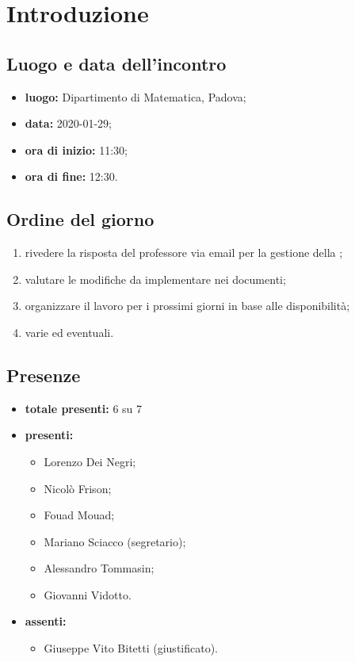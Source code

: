 \section*{Introduzione}

\subsection*{Luogo e data dell'incontro}
	\begin{itemize}
		\item \textbf{luogo:} Dipartimento di Matematica, Padova;
		\item \textbf{data:} 2020-01-29;
		\item \textbf{ora di inizio:} 11:30;
		\item \textbf{ora di fine:} 12:30.
	\end{itemize}

\subsection*{Ordine del giorno}
	\begin{enumerate}
			\item rivedere la risposta del professore via email per la gestione della ;
  			\item valutare le modifiche da implementare nei documenti;
  			\item organizzare il lavoro per i prossimi giorni in base alle disponibilità;
  			\item varie ed eventuali.
	\end{enumerate}

\subsection*{Presenze}
	\begin{itemize}
		\item \textbf{totale presenti:} 6 su 7
		\item \textbf{presenti: }
			\begin{itemize}			
				\item Lorenzo Dei Negri;
				\item Nicolò Frison;
				\item Fouad Mouad;
				\item Mariano Sciacco (segretario);
				\item Alessandro Tommasin;
				\item Giovanni Vidotto.
			\end{itemize}
		\item \textbf{assenti: } 
			\begin{itemize}	
				\item Giuseppe Vito Bitetti (giustificato).
			\end{itemize}
	\end{itemize}



